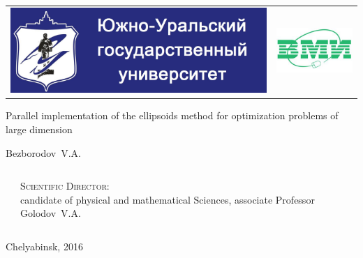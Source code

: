 \begin{frame}
\begin{center}

\begin{flushleft}
\begin{tabular}{ll}
\includegraphics[scale=0.05]{Images/Susu} &
\includegraphics[scale=0.1]{Images/Cmi}
\end{tabular}
\end{flushleft}

\begin{titleblock}
Parallel implementation of the ellipsoids method for optimization problems of large dimension
\end{titleblock}

\begin{center}
Bezborodov~V.A.
\end{center}

\vspace{0.5cm}

\begin{columns}[c]

\begin{column}{0.6\textwidth}
\end{column}

\begin{column}{0.4\textwidth}
\footnotesize
\textsc{Scientific Director:} \\
candidate of physical and mathematical Sciences, associate Professor Golodov~V.A.
\end{column}

\end{columns}

\vspace{1.5cm}

{\scriptsize Chelyabinsk, 2016}

\end{center}
\end{frame}